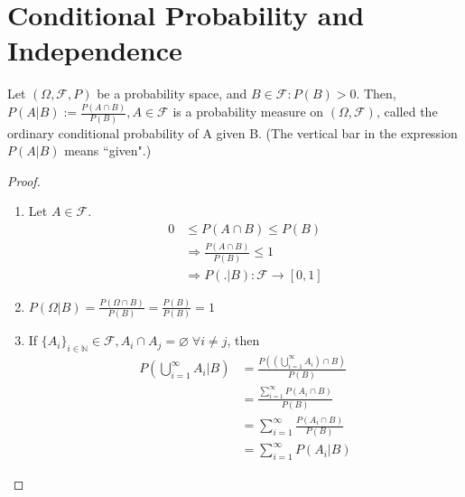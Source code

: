 \documentclass{article}
\begin{document}
	\section{Conditional Probability and Independence}
	\begin{myprop}{}{}
		Let $(\Omega, \mathcal{F}, P)$ be a probability space, and $B\in\mathcal{F} : P(B)>0$. Then, $P(A|B):=\frac{P(A\cap B)}{P(B)}, A\in\mathcal{F}$ is a probability measure on $(\Omega, \mathcal{F})$, called the ordinary conditional probability of A given B. (The vertical bar in the expression $P(A|B)$ means ``given".)
		\begin{proof}~
			\begin{enumerate}[label=(\roman*)]
				\item Let $A\in\mathcal{F}$.
				\begin{align*}
					0&\leq P(A\cap B)\leq P(B)\\
					&\Rightarrow\frac{P(A\cap B)}{P(B)}\leq1\\
					&\Rightarrow P(.|B) : \mathcal{F}\to[0, 1]
				\end{align*}
				\item $P(\Omega|B)=\frac{P(\Omega\cap B)}{P(B)}=\frac{P(B)}{P(B)}=1$
				\item If $\{A_i\}_{i\in\mathbb{N}}\in\mathcal{F}, A_i\cap A_j=\varnothing\;\forall i\neq j$, then
				\begin{align*}
					P(\bigcup_{i=1}^{\infty}A_i|B)&=\frac{P((\bigcup_{i=1}^{\infty}A_i)\cap B)}{P(B)}\\
					&=\frac{\sum_{i=1}^{\infty}P(A_i\cap B)}{P(B)}\\
					&=\sum_{i=1}^{\infty}\frac{P(A_i\cap B)}{P(B)}\\
					&=\sum_{i=1}^{\infty}P(A_i|B)
				\end{align*}
			\end{enumerate}
		\end{proof}
	\end{myprop}
	
\end{document}
